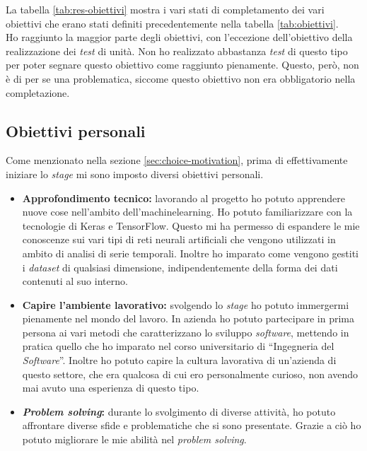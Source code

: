 La tabella \ref{tab:res-obiettivi} mostra i vari stati di completamento dei vari obiettivi che erano stati definiti precedentemente nella tabella \ref{tab:obiettivi}.\\
Ho raggiunto la maggior parte degli obiettivi, con l'eccezione dell'obiettivo della realizzazione dei \textit{test} di unità.
Non ho realizzato abbastanza \textit{test} di questo tipo per poter segnare questo obiettivo come raggiunto pienamente.
Questo, però, non è di per se una problematica, siccome questo obiettivo non era obbligatorio nella completazione.

\subsection{Obiettivi personali}\noindent
Come menzionato nella sezione \ref{sec:choice-motivation}, prima di effettivamente iniziare lo \textit{stage} mi sono imposto diversi obiettivi personali.
\begin{itemize}
    \item \textbf{Approfondimento tecnico:} lavorando al progetto ho potuto apprendere nuove cose nell'ambito dell'\gls{machinelearning}. Ho potuto familiarizzare con la tecnologie di Keras e TensorFlow. Questo mi ha permesso di espandere le mie conoscenze sui vari tipi di reti neurali artificiali che vengono utilizzati in ambito di analisi di serie temporali. Inoltre ho imparato come vengono gestiti i \textit{dataset} di qualsiasi dimensione, indipendentemente della forma dei dati contenuti al suo interno.
    \item \textbf{Capire l'ambiente lavorativo:} svolgendo lo \textit{stage} ho potuto immergermi pienamente nel mondo del lavoro. In azienda ho potuto partecipare in prima persona ai vari metodi che caratterizzano lo sviluppo \textit{software}, mettendo in pratica quello che ho imparato nel corso universitario di ``Ingegneria del \textit{Software}''. Inoltre ho potuto capire la cultura lavorativa di un'azienda di questo settore, che era qualcosa di cui ero personalmente curioso, non avendo mai avuto una esperienza di questo tipo.
    \item \textbf{\textit{Problem solving}:} durante lo svolgimento di diverse attività, ho potuto affrontare diverse sfide e problematiche che si sono presentate. Grazie a ciò ho potuto migliorare le mie abilità nel \textit{problem solving}.
\end{itemize}

